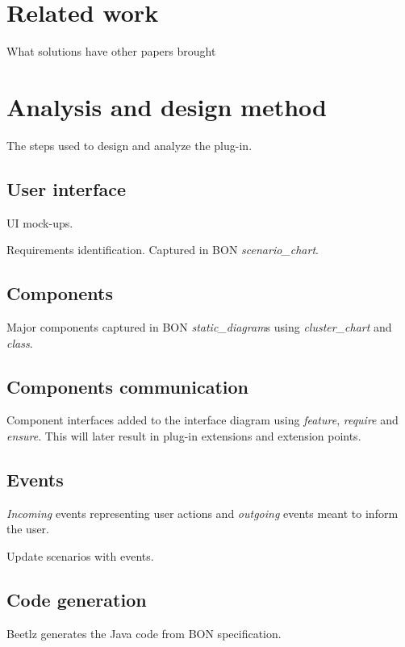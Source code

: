 \documentclass[conference]{IEEEtran}
\begin{document}
\section{Related work}
What solutions have other papers brought


\section{Analysis and design method}
The steps used to design and analyze the plug-in.



\subsection{User interface}
UI mock-ups. 


Requirements identification. Captured in BON \emph{scenario\_chart}.



\subsection{Components}
Major components captured in BON \emph{static\_diagram}s using \emph{cluster\_chart} and \emph{class}.



\subsection{Components communication}
Component interfaces added to the interface diagram using  \emph{feature}, \emph{require} and \emph{ensure}. This will later result in plug-in extensions and extension points.



\subsection{Events}
\emph{Incoming} events representing user actions and \emph{outgoing} events meant to inform the user.

Update scenarios with events.


\subsection{Code generation}
Beetlz generates the Java code from BON specification.
\end{document}
